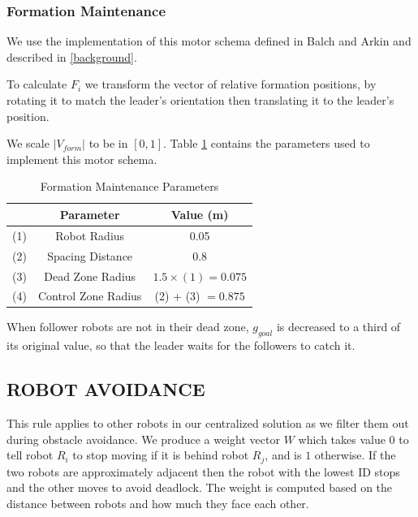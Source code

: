 \documentclass[letterpaper, 10 pt, conference]{ieeeconf}  %
\begin{document}
\subsubsection*{Formation Maintenance}

We use the implementation of this motor schema defined in Balch and Arkin and described in \ref{background}. 

To calculate $F_i$ we transform the vector of relative formation positions, by rotating it to match the leader's orientation then translating it to the leader's position.

We scale $\lvert V_{form}\rvert$ to be in $[0, 1]$. Table \ref{table_formation} contains the parameters used to implement this motor schema.

\begin{table}[h]
\caption{Formation Maintenance Parameters}
\label{table_formation}
\begin{center}
\begin{tabular}{|c|c|c|}
\hline
& Parameter & Value (m) \\
\hline
(1) & Robot Radius             & 0.05 \\
(2) & Spacing Distance        & 0.8 \\
(3) & Dead Zone Radius      & $1.5 \times (1) = 0.075$ \\
(4) & Control Zone Radius    & (2) $+$ (3) $=0.875$ \\
\hline
\end{tabular}
\end{center}
\end{table}

When follower robots are not in their dead zone, $g_{goal}$ is decreased to a third of its original value, so that the leader waits for the followers to catch it.

\subsection{ROBOT AVOIDANCE}

This rule applies to other robots in our centralized solution as we filter them out during obstacle avoidance. We produce a weight vector $W$ which takes value $0$ to tell robot $R_i$ to stop moving if it is behind robot $R_j$, and is $1$ otherwise. If the two robots are approximately adjacent then the robot with the lowest ID stops and the other moves to avoid deadlock. The weight is computed based on the distance between robots and how much they face each other.
\end{document}
